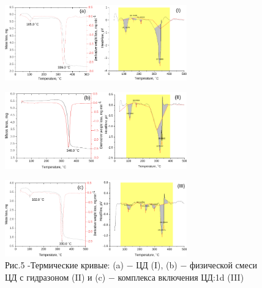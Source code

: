 \begin{figure}[H]
	\centering
	\includegraphics[width=0.7\textwidth]{media/chem2/image58}
\end{figure}
\begin{figure}[H]
	\centering
	\includegraphics[width=0.7\textwidth]{media/chem2/image59}
\end{figure}
\begin{figure}[H]
	\centering
	\includegraphics[width=0.7\textwidth]{media/chem2/image60}
	\caption*{Рис.5 -Термические кривые: (a) − ЦД (I), (b) − физической смеси ЦД с гидразоном (II) и (c) − комплекса включения ЦД:1d (III)}
\end{figure}

